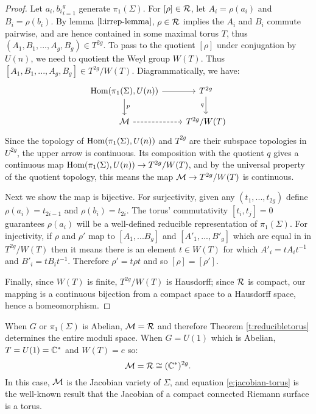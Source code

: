 	\begin{proof}
		Let ${a_i,b_i}_{i=1}^{g}$ generate $\pi_1(\Sigma)$. For $[\rho]\in \mathcal{R}$, let $A_i = \rho(a_i)$ and $B_i = \rho(b_i)$. By lemma $\ref{l:irrep-lemma}$, $\rho\in \mathcal{R}$ implies the $A_i$ and $B_i$ commute pairwise, and are hence contained in some maximal torus $T$, thus $(A_1,B_1,...,A_g,B_g)\in T^{2g}$. To pass to the quotient $[\rho]$ under conjugation by $U(n)$, we need to quotient the Weyl group $W(T)$. Thus $[A_1,B_1,...,A_g,B_g] \in T^{2g}/W(T)$. Diagrammatically, we have:
		\[\begin{tikzcd}
		{\Hom(\pi_1(\Sigma),U(n))} & {T^{2g}} \\
		\MM & {T^{2g}/W(T)}
		\arrow["p", from=1-1, to=2-1]
		\arrow[from=1-1, to=1-2]
		\arrow["q"', from=1-2, to=2-2]
		\arrow[dashed, from=2-1, to=2-2]
		\end{tikzcd}\]
		Since the topology of $\text{Hom}(\pi_1(\Sigma),U(n))$ and $T^{2g}$ are their subspace topologies in $U^{2g}$, the upper arrow is continuous. Its composition with the quotient $q$ gives a continuous map $\text{Hom}(\pi_1(\Sigma), U(n))\to T^{2g}/W(T)$, and by the universal property of the quotient topology, this means the map $\mathcal{M}\to T^{2g}/W(T)$ is continuous.
		
		Next we show the map is bijective. For surjectivity, given any $(t_1,...,t_{2g})$ define $\rho(a_i) = t_{2i-1}$ and $\rho(b_i) = t_{2i}$. The torus' commutativity $[t_i,t_j]=0$ guarantees $\rho(a_i)$ will be a well-defined reducible representation of $\pi_1(\Sigma)$. For injectivity, if $\rho$ and $\rho'$ map to $[A_1,...B_g]$ and $[A'_1,...,B'_g]$ which are equal in in $T^{2g}/W(T)$ then it means there is an element $t\in W(T)$ for which $A'_i = tA_it^{-1}$ and $B'_i = tB_i t^{-1}$. Therefore $\rho' = t\rho t$ and so $[\rho]=[\rho']$.
		
		Finally, since $W(T)$ is finite, $T^{2g}/W(T)$ is Hausdorff; since $\mathcal{R}$ is compact, our mapping is a continuous bijection from a compact space to a Hausdorff space, hence a homeomorphism.
	\end{proof}
	When $G$ or $\pi_1(\Sigma)$ is Abelian, $\mathcal{M} = \mathcal{R}$ and therefore Theorem \ref{t:reducibletorus} determines the entire moduli space. When $G=U(1)$ which is Abelian, $T = U(1) = \mathbb{C}^{\ast}$ and $W(T) = {e}$ so:
	\begin{equation}
		\label{e:jacobian-torus}
		\mathcal{M} = \mathcal{R} \cong (\mathbb{C}^{\ast})^{2g}.
	\end{equation}
	In this case, $\mathcal{M}$ is the Jacobian variety of $\Sigma$, and equation \ref{e:jacobian-torus} is the well-known result that the Jacobian of a compact connected Riemann surface is a torus. 
	
